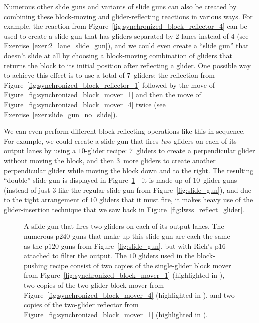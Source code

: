 Numerous other slide guns and variants of slide guns can also be created by combining these block-moving and glider-reflecting reactions in various ways. For example, the reaction from Figure~\ref{fig:synchronized_block_reflector_4} can be used to create a slide gun that has gliders separated by $2$ lanes instead of $4$ (see Exercise~\ref{exer:2_lane_slide_gun}), and we could even create a ``slide gun'' that doesn't slide at all by choosing a block-moving combination of gliders that returns the block to its initial position after reflecting a glider. One possible way to achieve this effect is to use a total of $7$~gliders: the reflection from Figure~\ref{fig:synchronized_block_reflector_1} followed by the move of Figure~\ref{fig:synchronized_block_mover_1} and then the move of Figure~\ref{fig:synchronized_block_mover_4} twice (see Exercise~\ref{exer:slide_gun_no_slide}).

We can even perform different block-reflecting operations like this in sequence. For example, we could create a slide gun that fires \emph{two} gliders on each of its output lanes by using a $10$-glider recipe: $7$~gliders to create a perpendicular glider without moving the block, and then $3$~more gliders to create another perpendicular glider while moving the block down and to the right. The resulting ``double'' slide gun is displayed in Figure~\ref{fig:double_slide_gun}---it is made up of $10$~glider guns (instead of just $3$ like the regular slide gun from Figure~\ref{fig:slide_gun}), and due to the tight arrangement of $10$ gliders that it must fire, it makes heavy use of the glider-insertion technique that we saw back in Figure~\ref{fig:lwss_reflect_glider}.

\begin{figure}[!htb]
	\centering
	\caption{A slide gun that fires two gliders on each of its output lanes. The numerous p$240$ guns that make up this slide gun are each the same as the p$120$ guns from Figure~\ref{fig:slide_gun}, but with Rich's p$16$ attached to filter the output. The $10$ gliders used in the block-pushing recipe consist of two copies of the single-glider block mover from Figure~\ref{fig:synchronized_block_mover_1} (highlighted in ), two copies of the two-glider block mover from Figure~\ref{fig:synchronized_block_mover_4} (highlighted in ), and two copies of the two-glider reflector from Figure~\ref{fig:synchronized_block_mover_1} (highlighted in ).}\label{fig:double_slide_gun}
\end{figure}

